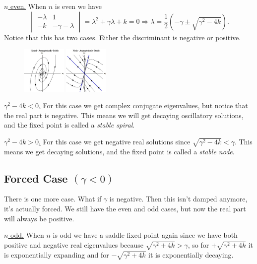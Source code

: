 \documentclass[reqno]{amsart}
\theoremstyle{definition}
\begin{document}
\underline{\Large $n$ even.}  When $n$ is even we have
%
\begin{equation}
\begin{vmatrix}
-\lambda & 1\\
 -k & -\gamma - \lambda
\end{vmatrix} = \lambda^2 + \gamma \lambda + k = 0 \Rightarrow \lambda
= \frac{1}{2}\left(-\gamma \pm \sqrt{\gamma^2 - 4k}\right).
\end{equation}
%
Notice that this has two cases.  Either the discriminant is negative or positive.

\begin{figure}
\centering
\includegraphics[width = 0.19\textwidth]{StableSpiral}
\includegraphics[width = 0.19\textwidth]{StableNode}
\end{figure}

\underline{\large $\gamma^2 - 4k < 0$.}  For this case we get complex conjugate
eigenvalues, but notice that the real part is negative.  This means we will get
decaying oscillatory solutions, and the fixed point is called a \emph{stable spiral}.

\underline{\large $\gamma^2 - 4k > 0$.}  For this case we get negative real solutions
since $\sqrt{\gamma^2 - 4k} < \gamma$.  This means we get decaying solutions,
and the fixed point is called a \emph{stable node}.

\subsection*{Forced Case $(\gamma < 0)$}  There is one more case.  What if
$\gamma$ is negative.  Then this isn't damped anymore, it's actually forced.
We still have the even and odd cases, but now the real part will always be
positive.

\underline{\Large $n$ odd.}  When $n$ is odd we have a saddle fixed point
again since we have both positive and negative real eigenvalues because $\sqrt{\gamma^2 + 4k} > \gamma$,
so for $+\sqrt{\gamma^2 + 4k}$ it is exponentially expanding and for
$-\sqrt{\gamma^2 + 4k}$ it is exponentially decaying.
\end{document}
